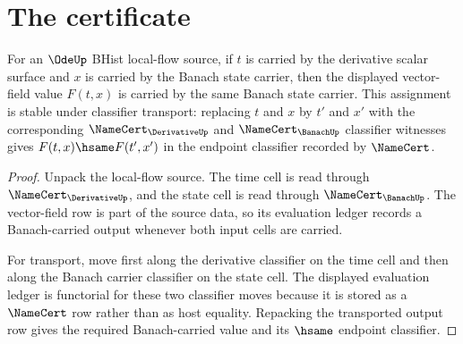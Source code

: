 \section{The certificate}
\label{sec:ode-certificate}

\begin{theorem}
\label{thm:ode-root-vector-field-carrier-stability}
For an $\OdeUp$ BHist local-flow source, if $t$ is carried by the derivative
scalar surface and $x$ is carried by the Banach state carrier, then the
displayed vector-field value $F(t,x)$ is carried by the same Banach state
carrier. This assignment is stable under classifier transport: replacing
$t$ and $x$ by $t'$ and $x'$ with the corresponding $\NameCert_{\DerivativeUp}$
and $\NameCert_{\BanachUp}$ classifier witnesses gives
$F(t,x)\hsame F(t',x')$ in the endpoint classifier recorded by $\NameCert$.
\end{theorem}
\begin{proof}
Unpack the local-flow source. The time cell is read through
$\NameCert_{\DerivativeUp}$, and the state cell is read through
$\NameCert_{\BanachUp}$. The vector-field row is part of the source data, so
its evaluation ledger records a Banach-carried output whenever both input
cells are carried.

For transport, move first along the derivative classifier on the time cell and
then along the Banach carrier classifier on the state cell. The displayed
evaluation ledger is functorial for these two classifier moves because it is
stored as a $\NameCert$ row rather than as host equality. Repacking the
transported output row gives the required Banach-carried value and its
$\hsame$ endpoint classifier.
\end{proof}

